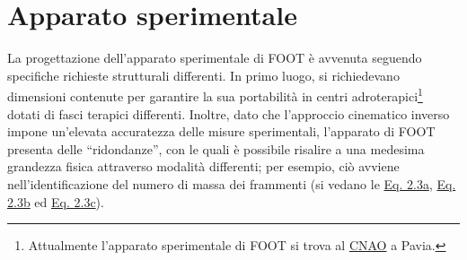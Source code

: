 \documentclass[12pt,a4paper,twoside]{report}
\begin{document}
	\section{Apparato sperimentale}
	La progettazione dell'apparato sperimentale di FOOT è avvenuta seguendo specifiche richieste strutturali differenti. In primo luogo, si richiedevano dimensioni contenute per garantire la sua portabilità in centri adroterapici\footnote{Attualmente l'apparato sperimentale di FOOT si trova al \hyperref[sec:adroterapia_italia]{CNAO} a Pavia.} dotati di fasci terapici differenti. Inoltre, dato che l'approccio cinematico inverso impone un'elevata accuratezza delle misure sperimentali, l'apparato di FOOT presenta delle ``ridondanze'', con le quali è possibile risalire a una medesima grandezza fisica attraverso modalità differenti; per esempio, ciò avviene nell'identificazione del numero di massa dei frammenti (si vedano le \hyperref[eq:a1]{Eq. 2.3a}, \hyperref[eq:a2]{Eq. 2.3b} ed \hyperref[eq:a3]{Eq. 2.3c}).
	
\end{document}
